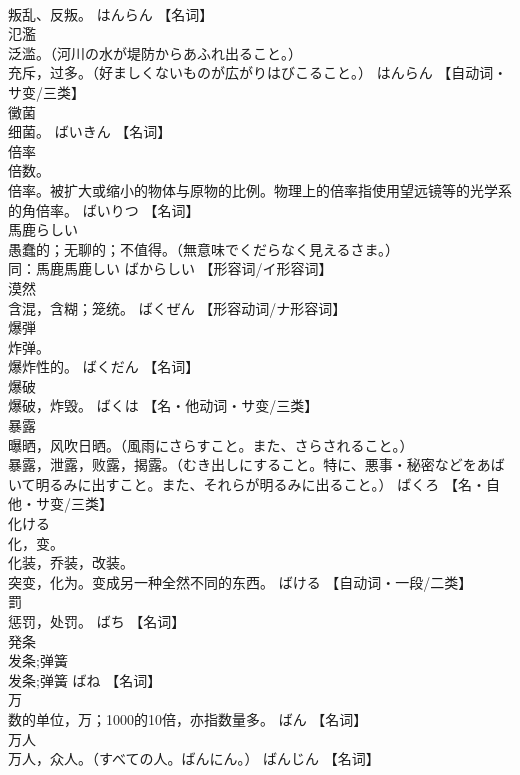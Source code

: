 \documentclass[8pt]{extreport}
\begin{document}
\begin{CJK}{UTF8}{min}
\\	叛乱、反叛。	はんらん		【名词】
\\	氾濫	
\\	泛滥。（河川の水が堤防からあふれ出ること。） 
\\	充斥，过多。（好ましくないものが広がりはびこること。）	はんらん		【自动词・サ变/三类】
\\	黴菌	
\\	细菌。	ばいきん		【名词】
\\	倍率	
\\	倍数。 
\\	倍率。被扩大或缩小的物体与原物的比例。物理上的倍率指使用望远镜等的光学系的角倍率。	ばいりつ		【名词】
\\	馬鹿らしい	
\\	愚蠢的；无聊的；不值得。（無意味でくだらなく見えるさま。） 
\\	同：馬鹿馬鹿しい	ばからしい		【形容词/イ形容词】
\\	漠然	
\\	含混，含糊；笼统。	ばくぜん		【形容动词/ナ形容词】
\\	爆弾	
\\	炸弹。 
\\	爆炸性的。	ばくだん		【名词】
\\	爆破	
\\	爆破，炸毁。	ばくは		【名・他动词・サ变/三类】
\\	暴露	
\\	曝晒，风吹日晒。（風雨にさらすこと。また、さらされること。） 
\\	暴露，泄露，败露，揭露。（むき出しにすること。特に、悪事・秘密などをあばいて明るみに出すこと。また、それらが明るみに出ること。）	ばくろ		【名・自他・サ变/三类】
\\	化ける	
\\	化，变。 
\\	化装，乔装，改装。 
\\	突变，化为。变成另一种全然不同的东西。	ばける		【自动词・一段/二类】
\\	罰	
\\	惩罚，处罚。	ばち		【名词】
\\	発条	
\\	发条;弹簧 
\\	发条;弹簧	ばね		【名词】
\\	万	
\\	数的单位，万；1000的10倍，亦指数量多。	ばん		【名词】
\\	万人	
\\	万人，众人。（すべての人。ばんにん。）	ばんじん		【名词】

\end{CJK}
\end{document}
